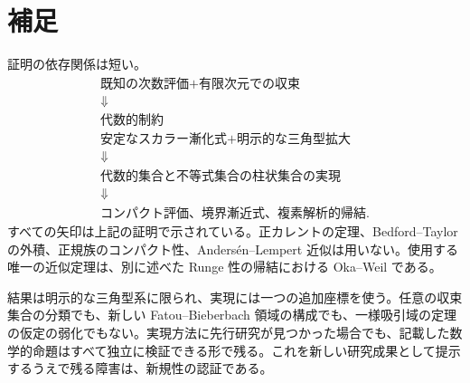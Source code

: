 \documentclass[12pt]{amsart}
\theoremstyle{definition}
\theoremstyle{remark}
\numberwithin{equation}{section}
\begin{document}
\section{補足}
証明の依存関係は短い。
\[
\begin{array}{c}
\text{既知の次数評価}+\text{有限次元での収束}\\
\Downarrow\\
\text{代数的制約}\\[3pt]
\text{安定なスカラー漸化式}+\text{明示的な三角型拡大}\\
\Downarrow\\
\text{代数的集合と不等式集合の柱状集合の実現}\\
\Downarrow\\
\text{コンパクト評価、境界漸近式、複素解析的帰結}.
\end{array}
\]
すべての矢印は上記の証明で示されている。正カレントの定理、Bedford--Taylor の外積、正規族のコンパクト性、Anders\'en--Lempert 近似は用いない。使用する唯一の近似定理は、別に述べた Runge 性の帰結における Oka--Weil である。

結果は明示的な三角型系に限られ、実現には一つの追加座標を使う。任意の収束集合の分類でも、新しい Fatou--Bieberbach 領域の構成でも、一様吸引域の定理の仮定の弱化でもない。実現方法に先行研究が見つかった場合でも、記載した数学的命題はすべて独立に検証できる形で残る。これを新しい研究成果として提示するうえで残る障害は、新規性の認証である。
\renewcommand{\refname}{参考文献}
\end{document}
